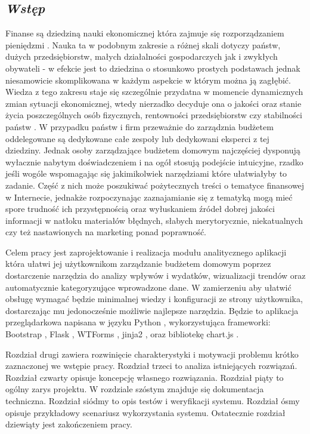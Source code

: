 \documentclass[a4paper,10pt, twoside]{report}
\newcommand{\customstylechapter}[1]{\large{\textit{#1}}}
\begin{document}
\begin{large}
\chapter{\customstylechapter{Wstęp}}
{Finanse są dziedziną nauki ekonomicznej która zajmuje się rozporządzaniem 
pieniędzmi \cite{wiki_ekonomia}. Nauka ta w podobnym zakresie a różnej skali 
dotyczy państw, dużych przedsiębiorstw, małych działalności gospodarczych jak i 
zwykłych obywateli - w efekcie jest to dziedzina o stosunkowo prostych 
podstawach jednak niesamowicie skomplikowana w każdym aspekcie w którym można ją
 zagłębić. Wiedza z tego zakresu staje się szczególnie przydatna w momencie 
dynamicznych zmian sytuacji ekonomicznej, wtedy nierzadko decyduje ona o jakości
 oraz stanie życia poszczególnych osób fizycznych, rentowności przedsiębiorstw 
czy stabilności państw \cite{zapaśćekonomiczna}. W przypadku państw i firm 
przeważnie do zarządznia budżetem oddelegowane są dedykowane całe zespoły lub 
dedykowani eksperci z tej dziedziny. Jednak osoby zarządzające budżetem domowym 
najczęściej dysponują wyłacznie nabytym doświadczeniem i na ogół stosują 
podejście intuicyjne, rzadko jeśli wogóle wspomagając się jakimikolwiek 
narzędziami które ułatwiałyby to zadanie. Część z nich może poszukiwać 
pożytecznych treści o tematyce finansowej w Internecie, jednakże rozpoczynając 
zaznajamianie się z tematyką mogą mieć spore trudność ich przystępnością oraz 
wyłuskaniem źródeł dobrej jakości informacji w natłoku materiałów błędnych, 
słabych merytorycznie, niekatualnych czy też nastawionych na marketing ponad 
poprawność.}

\medskip
{Celem pracy jest zaprojektowanie i realizacja modułu analitycznego aplikacji 
która ułatwi jej użytkownikom zarządzanie budżetem domowym poprzez dostarczenie 
narzędzia do analizy wpływów i wydatków, wizualizacji trendów oraz automatycznie 
kategoryzujące wprowadzone dane. W zamierzeniu aby ułatwić obsługę wymagać 
będzie minimalnej wiedzy i konfiguracji ze strony użytkownika, dostarczając mu 
jedonocześnie możliwie najlepsze narzędzia. Będzie to aplikacja przeglądarkowa napisana w 
języku Python \cite{Python}\cite{pythonautomate}, wykorzystująca frameworki: 
Bootstrap \cite{Bootstrap}, Flask \cite{Flask}, WTForms \cite{WTForms}, jinja2 
\cite{jinja}, oraz bibliotekę chart.js \cite{chart.js}.}

\medskip
{Rozdział drugi zawiera rozwinięcie charakterystyki i motywacji problemu krótko 
zaznaczonej we wstępie pracy. Rozdział trzeci to analiza istniejących rozwiązań.
 Rozdział czwarty opisuje koncepcję własnego rozwiązania. Rozdział piąty to 
ogólny zarys projektu. W rozdziale szóstym znajduje się dokumentacja techniczna.
Rozdział siódmy to opis testów i weryfikacji systemu. Rozdział ósmy opisuje 
przykładowy scenariusz wykorzystania systemu. Ostatecznie rozdział dziewiąty 
jest zakończeniem pracy.}


\end{large}
\end{document}
